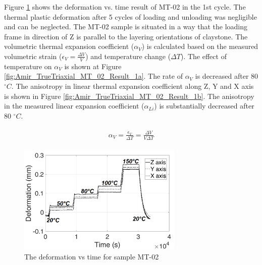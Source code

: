 Figure \ref{fig:Amir_TrueTriaxial_MT_02_Result} shows the deformation vs. time result of MT-02 in the 1st cycle. The thermal plastic deformation after 5 cycles of loading and unloading was negligible and can be neglected. The MT-02 sample is situated in a way that the loading frame in direction of Z is parallel to the layering orientations of claystone. The volumetric thermal expansion coefficient ($\alpha_V$) is calculated based on the measured volumetric strain ($\epsilon_V=\frac{\Delta V}{V}$) and temperature change ($\Delta T$). The effect of temperature on $\alpha_V$ is shown at Figure \ref{fig:Amir_TrueTriaxial_MT_02_Result_1a}. The rate of $\alpha_V$ is decreased after 80 $^{\circ}C$. The anisotropy in linear thermal expansion coefficient along Z, Y and X axis is shown in Figure \ref{fig:Amir_TrueTriaxial_MT_02_Result_1b}. The anisotropy in the measured linear expansion coefficient ($\alpha_{Li}$) is substantially decreased after 80 $^{\circ}C$.

\begin{align}
\label{eq:ThermalExpansion}
\begin{split}
\alpha_V=\frac{\epsilon_V}{\Delta T}=\frac{\Delta V}{V\Delta T}
\end{split}
\end{align}

\begin{figure}[!ht]
\centering
\includegraphics[width=0.7\textwidth]{figures/Amir_TrueTriaxial_MT_02_Result.png}
\caption{The deformation vs time for sample MT-02}
\label{fig:Amir_TrueTriaxial_MT_02_Result}
\end{figure} 

